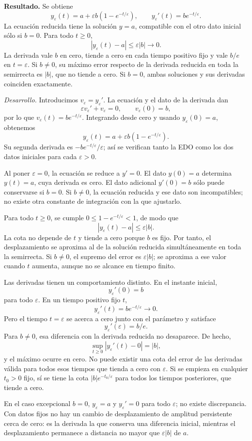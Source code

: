 \noindent\textbf{Resultado.} Se obtiene
\[
y_\varepsilon(t)=a+\varepsilon b(1-e^{-t/\varepsilon}),\qquad
 y_\varepsilon'(t)=b e^{-t/\varepsilon}.
\]
La ecuación reducida tiene la solución \(y=a\), compatible con el otro dato inicial sólo si \(b=0\). Para todo \(t\ge0\),
\[
|y_\varepsilon(t)-a|\le\varepsilon|b|\longrightarrow0.
\]
La derivada vale \(b\) en cero, tiende a cero en cada tiempo positivo fijo y vale \(b/e\) en \(t=\varepsilon\). Si \(b\ne0\), su máximo error respecto de la derivada reducida en toda la semirrecta es \(|b|\), que no tiende a cero. Si \(b=0\), ambas soluciones y sus derivadas coinciden exactamente.

\noindent\textit{Desarrollo.} Introducimos \(v_\varepsilon=y_\varepsilon'\). La ecuación y el dato de la derivada dan
\[
\varepsilon v_\varepsilon'+v_\varepsilon=0,\qquad
 v_\varepsilon(0)=b,
\]
por lo que \(v_\varepsilon(t)=b e^{-t/\varepsilon}\). Integrando desde cero y usando \(y_\varepsilon(0)=a\), obtenemos
\[
y_\varepsilon(t)=a+\varepsilon b(1-e^{-t/\varepsilon}).
\]
Su segunda derivada es \(-b e^{-t/\varepsilon}/\varepsilon\); así se verifican tanto la EDO como los dos datos iniciales para cada \(\varepsilon>0\).

Al poner \(\varepsilon=0\), la ecuación se reduce a \(y'=0\). El dato \(y(0)=a\) determina \(y(t)=a\), cuya derivada es cero. El dato adicional \(y'(0)=b\) sólo puede conservarse si \(b=0\). Si \(b\ne0\), la ecuación reducida y ese dato son incompatibles; no existe otra constante de integración con la que ajustarlo.

Para todo \(t\ge0\), se cumple \(0\le1-e^{-t/\varepsilon}<1\), de modo que
\[
|y_\varepsilon(t)-a|\le\varepsilon|b|.
\]
La cota no depende de \(t\) y tiende a cero porque \(b\) es fijo. Por tanto, el desplazamiento se aproxima al de la solución reducida simultáneamente en toda la semirrecta. Si \(b\ne0\), el supremo del error es \(\varepsilon|b|\); se aproxima a ese valor cuando \(t\) aumenta, aunque no se alcance en tiempo finito.

Las derivadas tienen un comportamiento distinto. En el instante inicial,
\[
y_\varepsilon'(0)=b
\]
para todo \(\varepsilon\). En un tiempo positivo fijo \(t\),
\[
y_\varepsilon'(t)=b e^{-t/\varepsilon}\longrightarrow0.
\]
Pero el tiempo \(t=\varepsilon\) se acerca a cero junto con el parámetro y satisface
\[
y_\varepsilon'(\varepsilon)=b/e.
\]
Para \(b\ne0\), esa diferencia con la derivada reducida no desaparece. De hecho,
\[
\sup_{t\ge0}|y_\varepsilon'(t)-0|=|b|,
\]
y el máximo ocurre en cero. No puede existir una cota del error de las derivadas válida para todos esos tiempos que tienda a cero con \(\varepsilon\). Si se empieza en cualquier \(t_0>0\) fijo, sí se tiene la cota \(|b|e^{-t_0/\varepsilon}\) para todos los tiempos posteriores, que tiende a cero.

En el caso excepcional \(b=0\), \(y_\varepsilon=a\) y \(y_\varepsilon'=0\) para todo \(\varepsilon\); no existe discrepancia. Con datos fijos no hay un cambio de desplazamiento de amplitud persistente cerca de cero: es la derivada la que conserva una diferencia inicial, mientras el desplazamiento permanece a distancia no mayor que \(\varepsilon|b|\) de \(a\).
